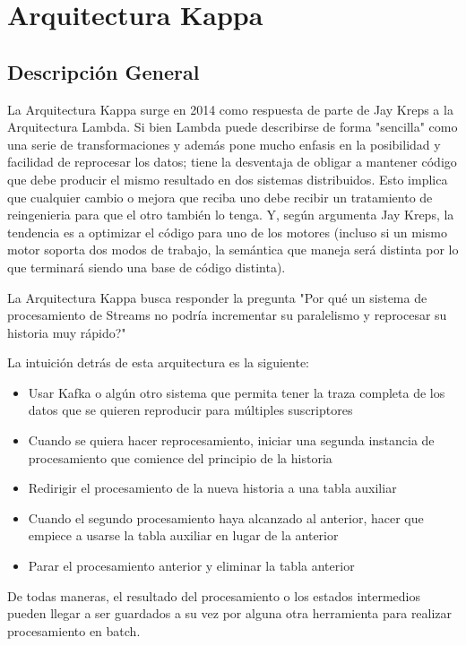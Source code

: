 \section{Arquitectura Kappa}

\subsection{Descripción General}

La Arquitectura Kappa surge en 2014 como respuesta de parte de Jay Kreps a la Arquitectura Lambda. 
Si bien Lambda puede describirse de forma "sencilla" como una serie de transformaciones y además pone 
mucho enfasis en la posibilidad y facilidad de reprocesar los datos; 
tiene la desventaja de obligar a mantener código que debe producir el mismo resultado en dos sistemas
distribuidos. Esto implica que cualquier cambio o mejora que reciba uno debe recibir un tratamiento
de reingenieria para que el otro también lo tenga. Y, según argumenta Jay Kreps, la tendencia es a 
optimizar el código para uno de los motores (incluso si un mismo motor soporta dos modos de trabajo, 
la semántica que maneja será distinta por lo que terminará siendo una base de código distinta). \parencite{kreps2014questioning}

La Arquitectura Kappa busca responder la pregunta "Por qué un sistema de procesamiento de Streams no podría 
incrementar su paralelismo y reprocesar su historia muy rápido?"   

La intuición detrás de esta arquitectura es la siguiente: 

\begin{itemize}
    \item Usar Kafka o algún otro sistema que permita tener la traza completa de los datos que se quieren reproducir para múltiples suscriptores
    \item Cuando se quiera hacer reprocesamiento, iniciar una segunda instancia de procesamiento que comience del principio de la historia
    \item Redirigir el procesamiento de la nueva historia a una tabla auxiliar
    \item Cuando el segundo procesamiento haya alcanzado al anterior, hacer que empiece a usarse la tabla auxiliar en lugar de la anterior
    \item Parar el procesamiento anterior y eliminar la tabla anterior
\end{itemize}

De todas maneras, el resultado del procesamiento o los estados intermedios pueden llegar a ser guardados a su vez por alguna otra herramienta
para realizar procesamiento en batch. 

